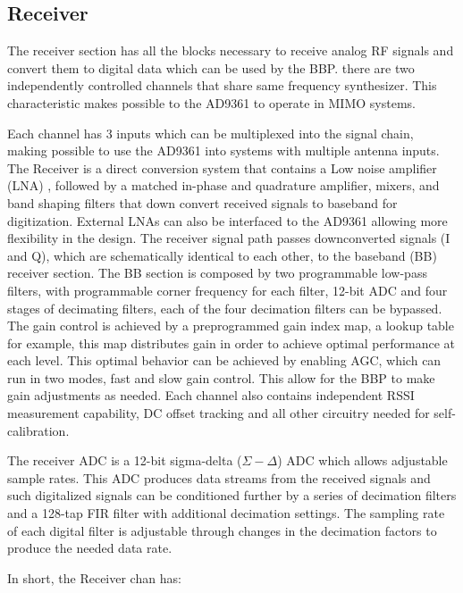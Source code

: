 
\subsection{Receiver}

The receiver section has all the blocks necessary to receive analog RF signals and convert them to digital data which can be used by the BBP. there are two independently controlled channels that share same frequency synthesizer. This characteristic makes possible to the AD9361 to operate in MIMO systems.

Each channel has 3 inputs which can be multiplexed into the signal chain, making possible to use the AD9361 into systems with multiple antenna inputs. The Receiver is a direct conversion system that contains a Low noise amplifier (LNA) , followed by a matched in-phase and quadrature amplifier, mixers, and band shaping filters that down convert received signals to baseband for digitization. External LNAs can also be interfaced to the AD9361 allowing more flexibility in the design.
The receiver signal path passes downconverted signals (I and Q), which are schematically identical to each other,  to the baseband (BB) receiver section. The BB section is composed by two programmable low-pass filters, with programmable corner frequency for each filter, 12-bit ADC and four stages of decimating filters, each of the four decimation filters can be bypassed. 
The gain control is achieved by a preprogrammed gain index map, a lookup table for example, this map distributes gain in order to achieve optimal performance at each level. This optimal behavior can be achieved by enabling AGC, which can run in two modes, fast and slow gain control. This allow for the BBP to make gain adjustments as needed.
Each channel also contains independent RSSI measurement capability, DC offset tracking and all other circuitry needed for self-calibration.



The receiver ADC is a 12-bit sigma-delta ($\Sigma-\Delta$) ADC which allows adjustable sample rates. This ADC produces data streams from the received signals and such digitalized signals can be conditioned further by a series of decimation filters and a 128-tap FIR filter with additional decimation settings.
The sampling rate of each digital filter is adjustable through changes in the decimation factors to produce the needed data rate.

In short, the Receiver chan has:

